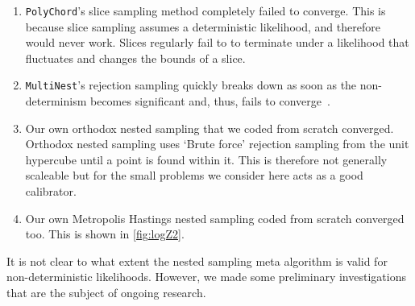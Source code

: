 \begin{enumerate}
    \item \texttt{PolyChord}'s slice sampling method completely failed to converge. \cite{Handley_2015} This is because slice sampling assumes a deterministic likelihood, and therefore would never work. Slices regularly fail to to terminate under a likelihood that fluctuates and changes the bounds of a slice.
    \item \texttt{MultiNest}'s rejection sampling quickly breaks down as soon as the non-determinism becomes significant and, thus, fails to converge~\cite{Feroz_2009}.
    \item Our own orthodox nested sampling that we coded from scratch converged. Orthodox nested sampling uses `Brute force' rejection sampling from the unit hypercube until a point is found within it. This is therefore not generally scaleable but for the small problems we consider here acts as a good calibrator. 
    \item Our own Metropolis Hastings nested sampling coded from scratch converged too. This is shown in \cref{fig:logZ2}. \cite{doi:10.1080/00031305.1995.10476177}
\end{enumerate}

It is not clear to what extent the nested sampling meta algorithm is valid for non-deterministic likelihoods. However, we made some preliminary investigations that are the subject of ongoing research.



